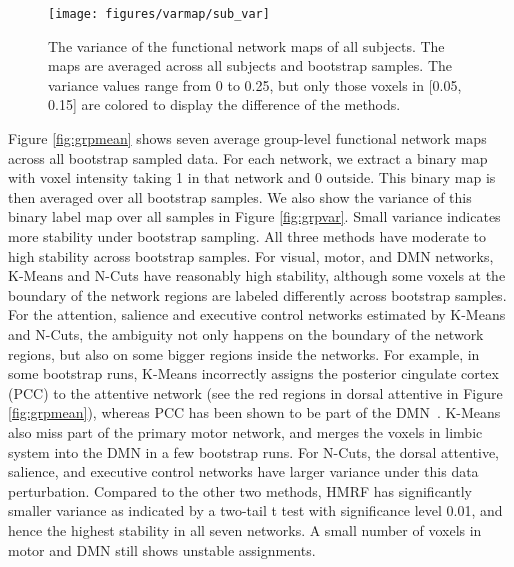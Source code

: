 \documentclass[review,authoryear]{elsarticle}
\begin{document}
\begin{figure*}[htb]
  \centering
  \texttt{[image: figures/varmap/sub\_var]}
  \caption{The variance of the functional network maps of all subjects. The maps
    are averaged across all subjects and bootstrap samples. The variance values
    range from 0 to 0.25, but only those voxels in [0.05, 0.15] are colored to
    display the difference of the methods. }
  \label{fig:subvar}
\end{figure*}

Figure \ref{fig:grpmean} shows seven average group-level functional network maps
across all bootstrap sampled data. For each network, we extract a binary map
with voxel intensity taking 1 in that network and 0 outside. This binary map is
then averaged over all bootstrap samples. We also show the variance of this
binary label map over all samples in Figure \ref{fig:grpvar}. Small variance
indicates more stability under bootstrap sampling.  All three methods have
moderate to high stability across bootstrap samples. For visual, motor, and DMN
networks, K-Means and N-Cuts have reasonably high stability, although some
voxels at the boundary of the network regions are labeled differently across
bootstrap samples. For the attention, salience and executive control networks
estimated by K-Means and N-Cuts, the ambiguity not only happens on the boundary
of the network regions, but also on some bigger regions inside the networks. For
example, in some bootstrap runs, K-Means incorrectly assigns the posterior
cingulate cortex (PCC) to the attentive network (see the red regions in dorsal
attentive in Figure \ref{fig:grpmean}), whereas PCC has been shown to be part of
the DMN~\citep{greicius2003functional}. K-Means also miss part of the primary
motor network, and merges the voxels in limbic system into the DMN in a few
bootstrap runs. For N-Cuts, the dorsal attentive, salience, and executive
control networks have larger variance under this data perturbation. Compared to
the other two methods, HMRF has significantly smaller variance as indicated by a
two-tail t test with significance level 0.01, and hence the highest stability
in all seven networks. A small number of voxels in motor and DMN still shows
unstable assignments.
\end{document}

